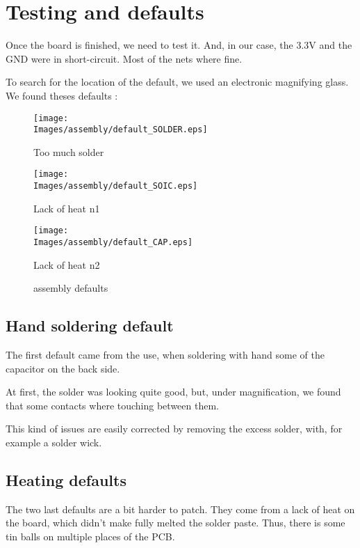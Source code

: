\section{Testing and defaults}
Once the board is finished, we need to test it. And, in our case, the $3.3 \si{\volt}$
and the GND were in short-circuit. Most of the nets where fine.

To search for the location of the default, we used an electronic magnifying glass.
We found theses defaults :

\begin{figure}[!hbt]
    \centering
    \begin{minipage}[c]{0.32\textwidth}
        \centering
        \texttt{[image: \\Images/assembly/default\_SOLDER.eps]}
        \caption*{Too much solder}
    \end{minipage}%
    \hfill%
    \begin{minipage}[c]{0.32\textwidth}
        \centering
        \texttt{[image: \\Images/assembly/default\_SOIC.eps]}
        \caption*{Lack of heat n1}
    \end{minipage}%
    \hfill%
    \begin{minipage}[c]{0.32\textwidth}
        \centering
        \texttt{[image: \\Images/assembly/default\_CAP.eps]}
        \caption*{Lack of heat n2}
    \end{minipage}%
    \label{img:defaults}
    \caption{assembly defaults}
\end{figure}
\FloatBarrier

\subsection{Hand soldering default}
The first default came from the use, when soldering with hand some of the
capacitor on the back side.

At first, the solder was looking quite good, but, under magnification, we
found that some contacts where touching between them.

This kind of issues are easily corrected by removing the excess solder,
with, for example a solder wick.

\subsection{Heating defaults}
The two last defaults are a bit harder to patch. They come from a lack
of heat on the board, which didn't make fully melted the solder paste.
Thus, there is some tin balls on multiple places of the PCB.

